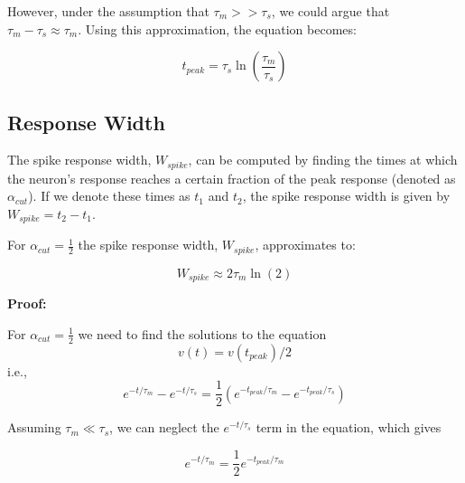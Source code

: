 However, under the assumption that $\tau_m >> \tau_s$, we could argue that $\tau_m - \tau_s \approx \tau_m$. Using this approximation, the equation becomes:

\begin{equation}
t_{peak} = \tau_s \ln\left(\frac{\tau_m}{\tau_s}\right)
\end{equation}


\subsection{Response Width}

The spike response width, $W_{spike}$, can be computed by finding the times at which the neuron's response reaches a certain fraction of the peak response (denoted as $\alpha_{cut}$). If we denote these times as $t_1$ and $t_2$, the spike response width is given by $W_{spike} = t_2 - t_1$.

\begin{mdframed}[backgroundcolor=red_background, linecolor=black, linewidth=2pt, frametitle=\textbf{Statement}]
\begin{center}

    \label{st:window-width}
    For $\alpha_{cut} = \frac{1}{2}$ the spike response width, $W_{spike}$, approximates to:

    \begin{equation}
        W_{spike} \approx 2\tau_m \ln(2)
    \end{equation}

\end{center}
\end{mdframed}


\textbf{Proof:}

For $\alpha_{cut} = \frac{1}{2}$ we need to find the solutions to the equation
\begin{equation}
    v(t) = v(t_{peak})/2
\end{equation}
i.e.,
\begin{equation}
e^{-t/\tau_m} - e^{-t/\tau_s} = \frac{1}{2}\left(e^{-t_{peak}/\tau_m} - e^{-t_{peak}/\tau_s}\right)
\end{equation}

Assuming $\tau_m \ll \tau_s$, we can neglect the $e^{-t/\tau_s}$ term in the equation, which gives

\begin{equation}
e^{-t/\tau_m} = \frac{1}{2} e^{-t_{peak}/\tau_m}
\end{equation}



